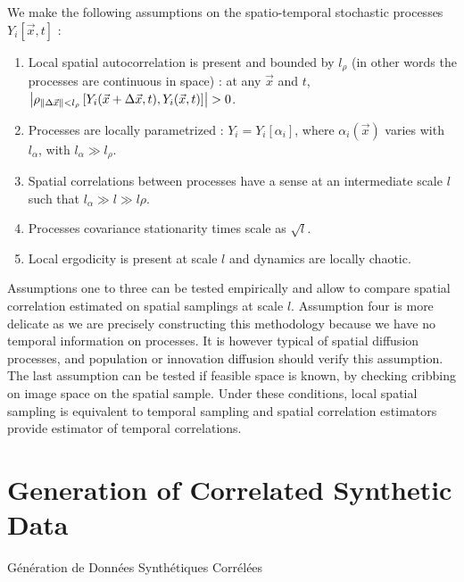 We make the following assumptions on the spatio-temporal stochastic processes $Y_i\left[\vec{x},t\right]$ :
\begin{enumerate}
\item Local spatial autocorrelation is present and bounded by $l_{\rho}$ (in other words the processes are continuous in space) : at any $\vec{x}$ and $t$, $\left|\rho_{\| \Delta \vec{x} \| < l_{\rho}}\left[Y_i (\vec{x}+\Delta \vec{x},t), Y_i (\vec{x},t) \right]\right| > 0$.
\item Processes are locally parametrized : $Y_i = Y_i\left[\alpha_i\right]$, where $\alpha_i (\vec{x})$ varies with $l_{\alpha}$, with $l_{\alpha} \gg l_{\rho}$.
\item Spatial correlations between processes have a sense at an intermediate scale $l$ such that $l_{\alpha}\gg l \gg l{\rho}$.
\item Processes covariance stationarity times scale as $\sqrt{l}$.
\item Local ergodicity is present at scale $l$ and dynamics are locally chaotic.
\end{enumerate}


Assumptions one to three can be tested empirically and allow to compare spatial correlation estimated on spatial samplings at scale $l$. Assumption four is more delicate as we are precisely constructing this methodology because we have no temporal information on processes. It is however typical of spatial diffusion processes, and population or innovation diffusion should verify this assumption. The last assumption can be tested if feasible space is known, by checking cribbing on image space on the spatial sample. Under these conditions, local spatial sampling is equivalent to temporal sampling and spatial correlation estimators provide estimator of temporal correlations.










\newpage



\section{Generation of Correlated Synthetic Data}{Génération de Données Synthétiques Corrélées}




